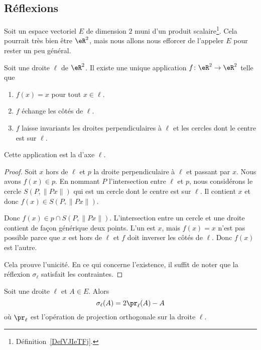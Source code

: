 \subsection{Réflexions}

Soit un espace vectoriel \( E\) de dimension \( 2\) muni d'un produit scalaire\footnote{Définition~\ref{DefVJIeTFj}.}. Cela pourrait très bien être \( \eR^2\), mais nous allons nous efforcer de l'appeler \( E\) pour rester un peu général.

\begin{lemmaDef}        \label{DEFooLJKDooUaamen}
	Soit une droite \( \ell\) de \( \eR^2\). Il existe une unique application \( f\colon \eR^2\to \eR^2\) telle que
	\begin{enumerate}
		\item
		      \( f(x)=x\) pour tout \( x\in \ell\).
		\item
		      \( f\) échange les côtés de \( \ell\).
		\item
		      \( f\) laisse invariants les droites perpendiculaires à \( \ell\) et les cercles dont le centre est sur \( \ell\).
	\end{enumerate}
	Cette application est la  d'axe \( \ell\).
\end{lemmaDef}

\begin{proof}
	Soit \( x\) hors de \( \ell\) et \( p\) la droite perpendiculaire à \( \ell\) et passant par \( x\). Nous avons \( f(x)\in p\). En nommant \( P\) l'intersection entre \( \ell\) et \( p\), nous considérons le cercle \( S(P,\| Px \|)\) qui est un cercle dont le centre est sur \( \ell\). Il contient \( x\) et donc \( f(x)\in S(P,\| Px \|)\).

	Donc \( f(x)\in p\cap S(P,\| Px \|)\). L'intersection entre un cercle et une droite contient de façon générique deux points. L'un est \( x\), mais \( f(x)=x\) n'est pas possible parce que \( x\) est hors de \( \ell\) et \( f\) doit inverser les côtés de \( \ell\). Donc \( f(x)\) est l'autre.

	Cela prouve l'unicité. En ce qui concerne l'existence, il suffit de noter que la réflexion \( \sigma_{\ell}\) satisfait les contraintes.
\end{proof}

\begin{lemma}       \label{LEMooZSDRooUkNYer}
	Soit une droite \( \ell\) et \( A\in E\). Alors
	\begin{equation}        \label{EQooVUQDooKuwszl}
		\sigma_{\ell}(A)=2\pr_{\ell}(A)-A
	\end{equation}
	où \( \pr_{\ell}\) est l'opération de projection orthogonale sur la droite \( \ell\).
\end{lemma}

